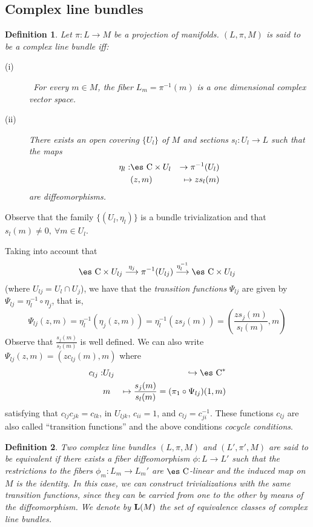 \documentclass[12pt]{article}
\theoremstyle{plain}
\newtheorem{definition}{Definition}
\def\beann{\begin{eqnarray*}}
\def\eeann{\end{eqnarray*}}
\def\mapping#1{\mathrel{\mathop{\longrightarrow}\limits^{#1}}}
\def\Complex{\mbox{\es C}}
\begin{document}
\subsection{Complex line bundles}


\begin{definition}
Let $\pi :L \to M$ be a projection of manifolds.
$(L,\pi ,M)$ is said to be a {\rm complex line bundle} iff:
\begin{description}
\item[{\rm (i)}] \
For every $m \in M$, the fiber $L_m = \pi^{-1}(m)$
is a one dimensional complex vector space.
\item[{\rm (ii)}]
There exists an open covering $\{ U_l \}$ of $M$
and sections $s_l:U_l \to L$ such that the maps
\beann
\eta_l : & \Complex \times U_l & \to  \pi^{-1}(U_l)
\\
& (z,m) & \mapsto zs_l(m)
\eeann
are diffeomorphisms.
\end{description}
\label{clb}
\end{definition}

Observe that the family $\{ (U_l,\eta_l) \}$
is a bundle trivialization and that $s_l(m) \not= 0, \ \forall m \in
U_l$.

Taking into account that
$$
\Complex \times U_{l j} \mapping{\eta_j}
\pi^{-1}(U_{l j}) \mapping{\eta_l^{-1}} \Complex \times U_{l j}
$$
(where $U_{l j}=U_l \cap U_j$), we have that the {\it transition
functions}
$\Psi_{l j}$ are given by $\Psi_{l j} = \eta_l^{-1} \circ \eta_j$, that
is,
$$
\Psi_{l j}(z,m) = \eta_l^{-1}(\eta_j(z,m)) =
\eta_l^{-1}(zs_j(m)) =
\left(\frac {zs_j(m)}{s_l(m)},m\right)
$$
Observe that $\frac{s_j(m)}{s_l(m)}$ is well defined.
We can also write $\Psi_{l j}(z,m) =(zc_{l j}(m),m)$ where
\beann
c_{l j} : & U_{l j} & \hookrightarrow \Complex^*
\\
& m & \mapsto \frac{s_j(m)}{s_l(m)} = (\pi_1 \circ \Psi_{l j})(1,m)
\eeann
satisfying that $c_{l j}c_{jk} = c_{l k}$, in $U_{l jk}$,
$c_{ii} = 1$, and $c_{l j} = c_{ji}^{-1}$.
These functions $c_{l j}$ are also called ``transition functions''
and the above conditions {\it cocycle conditions}.

\begin{definition}
Two complex line bundles $(L,\pi ,M)$ and $(L',\pi ',M)$
are said to be {\rm equivalent} if there exists a fiber diffeomorphism
$\phi : L \to L'$ such that the restrictions to the fibers
$\phi_m : L_m \to L_m'$ are $\Complex$-linear and the induced map on $M$
is the identity. In this case, we can construct trivializations with the same
transition functions, since they can be carried from one to the other
by means of the diffeomorphism.
We denote by ${\bf L}(M)$ the set of equivalence classes of complex line
bundles.
\label{clbe}
\end{definition}
\end{document}
